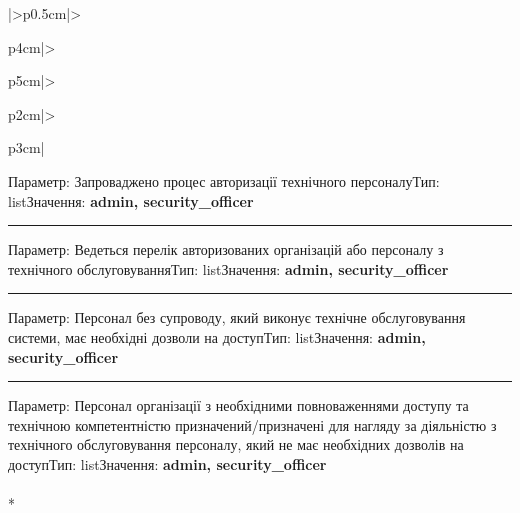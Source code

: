 \documentclass[10pt]{article}
\begin{document}
\begin{longtable}{|>{\centering\arraybackslash}p{0.5cm}|>{\raggedright\arraybackslash}p{4cm}|>{\raggedright\arraybackslash}p{5cm}|>{\raggedright\arraybackslash}p{2cm}|>{\raggedright\arraybackslash}p{3cm}|}
Параметр: Запроваджено процес авторизації технічного персоналу\newline Тип: list\newline Значення: \textbf{admin, security\_\allowbreak{}officer}\vspace{1mm}\newline\noindent\rule{\linewidth}{0.4pt}\vspace{1mm}
Параметр: Ведеться перелік авторизованих організацій або персоналу з технічного обслуговування\newline Тип: list\newline Значення: \textbf{admin, security\_\allowbreak{}officer}\vspace{1mm}\newline\noindent\rule{\linewidth}{0.4pt}\vspace{1mm}
Параметр: Персонал без супроводу, який виконує технічне обслуговування системи, має необхідні дозволи на доступ\newline Тип: list\newline Значення: \textbf{admin, security\_\allowbreak{}officer}\vspace{1mm}\newline\noindent\rule{\linewidth}{0.4pt}\vspace{1mm}
Параметр: Персонал організації з необхідними повноваженнями доступу та технічною компетентністю призначений/призначені для нагляду за діяльністю з технічного обслуговування персоналу, який не має необхідних дозволів на доступ\newline Тип: list\newline Значення: \textbf{admin, security\_\allowbreak{}officer} \\ \hline
{} \\* 

\end{longtable}
\end{document}

